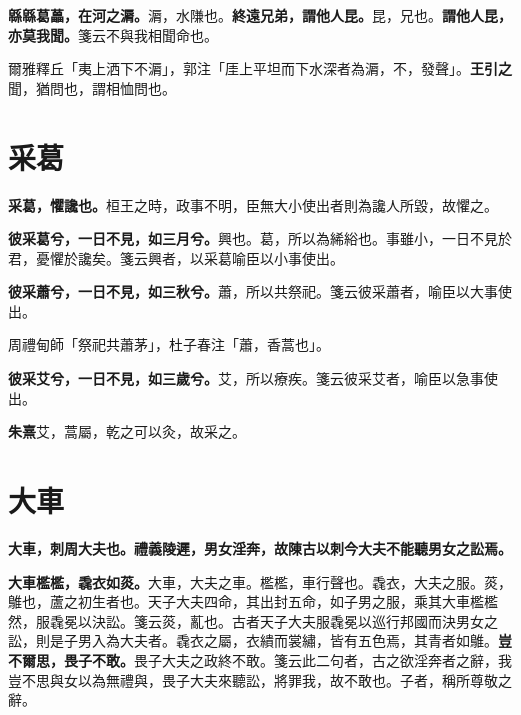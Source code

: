 \textbf{緜緜葛藟，在河之漘。}{\footnotesize 漘，水隒也。}\textbf{終遠兄弟，謂他人昆。}{\footnotesize 昆，兄也。}\textbf{謂他人昆，亦莫我聞。}{\footnotesize 箋云不與我相聞命也。}

\begin{quoting}爾雅釋丘「夷上洒下不漘」，郭注「厓上平坦而下水深者為漘，不，發聲」。\textbf{王引之}聞，猶問也，謂相恤問也。\end{quoting}

\section{采葛}


\textbf{采葛，懼讒也。}{\footnotesize 桓王之時，政事不明，臣無大小使出者則為讒人所毀，故懼之。}

\textbf{彼采葛兮，一日不見，如三月兮。}{\footnotesize 興也。葛，所以為絺綌也。事雖小，一日不見於君，憂懼於讒矣。箋云興者，以采葛喻臣以小事使出。}

\textbf{彼采蕭兮，一日不見，如三秋兮。}{\footnotesize 蕭，所以共祭祀。箋云彼采蕭者，喻臣以大事使出。}

\begin{quoting}周禮甸師「祭祀共蕭茅」，杜子春注「蕭，香蒿也」。\end{quoting}

\textbf{彼采艾兮，一日不見，如三歲兮。}{\footnotesize 艾，所以療疾。箋云彼采艾者，喻臣以急事使出。}

\begin{quoting}\textbf{朱熹}艾，蒿屬，乾之可以灸，故采之。\end{quoting}

\section{大車}


\textbf{大車，刺周大夫也。禮義陵遲，男女淫奔，故陳古以刺今大夫不能聽男女之訟焉。}

\textbf{大車檻檻，毳衣如菼。}{\footnotesize 大車，大夫之車。檻檻，車行聲也。毳衣，大夫之服。菼，鵻也，蘆之初生者也。天子大夫四命，其出封五命，如子男之服，乘其大車檻檻然，服毳冕以決訟。箋云菼，薍也。古者天子大夫服毳冕以巡行邦國而決男女之訟，則是子男入為大夫者。毳衣之屬，衣繢而裳繡，皆有五色焉，其青者如鵻。}\textbf{豈不爾思，畏子不敢。}{\footnotesize 畏子大夫之政終不敢。箋云此二句者，古之欲淫奔者之辭，我豈不思與女以為無禮與，畏子大夫來聽訟，將罪我，故不敢也。子者，稱所尊敬之辭。}

